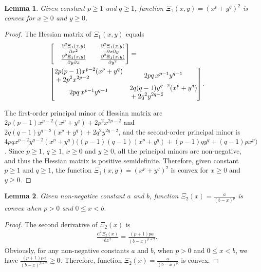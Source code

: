 \documentclass[10pt,journal,compsoc]{IEEEtran}
\newtheorem{lemma}{\textbf{Lemma}}
\newtheorem*{proof}{Proof}
\begin{document}
\begin{lemma}\label{lemma:Prove-Convex-1}
    Given constant $p \ge 1$ and $q \ge 1$, function $\Xi_{1}(x, y) = \left(x^{p} + y^{q}\right)^{2}$ is convex for $x \ge 0$ and $y \ge 0$.
\end{lemma}
\begin{proof}
    The Hessian matrix of $\Xi_{1}(x, y)$ equals
    \begin{align}
        &\begin{bmatrix}
        &\frac{\partial^{2}\Xi_{1}(x ,y)}{\partial x^{2}} &
        &\frac{\partial^{2}\Xi_{1}(x ,y)}{\partial x \partial y} \\
        &\frac{\partial^{2}\Xi_{1}(x ,y)}{\partial y \partial x} &
    &\frac{\partial^{2}\Xi_{1}(x ,y)}{\partial y^{2}}
        \end{bmatrix}
        = \notag \\
        &\begin{bmatrix}
        \begin{aligned}
        &2p(p-1)x^{p-2}(x^p+y^q) \\
        &+2p^2x^{2p-2}
        \end{aligned}
        &
        2pq\,x^{p-1}y^{q-1}
        \\
        2pq\,x^{p-1}y^{q-1}
        &
        \begin{aligned}
        &2q(q-1)y^{q-2}(x^p+y^q) \\
        &+2q^2y^{2q-2}
        \end{aligned}
        \end{bmatrix}.
    \end{align}

    The first-order principal minor of Hessian matrix are $2p(p-1)x^{p-2}(x^p+y^q)+2p^2x^{2p-2}$ and $2q(q-1)y^{q-2}(x^p+y^q)+2q^2y^{2q-2}$, 
    and the second-order principal minor is $4pqx^{p-2}y^{q-2}\left(x^{p} + y^{q}\right)\big((p - 1)(q - 1)\left(x^{p} + y^{q}\right) + (p - 1)qy^{q} + (q - 1)px^{p}\big)$. 
    Since $p \ge 1$, $q \ge 1$, $x \ge 0$ and $y \ge 0$, all the principal minors are non-negative, and thus the Hessian matrix is positive semidefinite. 
    Therefore, given constant $p \ge 1$ and $q \ge 1$, the function $\Xi_{1}(x, y) = (x^p + y^q)^2$ is convex for $x \ge 0$ and $y \ge 0$.
\end{proof}
\begin{lemma}\label{lemma:Prove-Convex-2}
    Given non-negative constant $a$ and $b$, function $\Xi_{2}(x) = \frac{a}{\left(b - x\right)^{p}}$ is convex when $p > 0$ and $0 \le x < b$.
\end{lemma}
\begin{proof}
    The second derivative of $\Xi_{2}(x)$ is
    \begin{align}
        \frac{\mathrm{d}^{2}\Xi_{2}(x)}{\mathrm{d}x^{2}} = \frac{(p + 1)pa}{\left(b - x\right)^{p + 2}}.
    \end{align}
    Obviously, for any non-negative constants $a$ and $b$, when $p > 0$ and $0 \le x < b$, we have $\frac{(p + 1)pa}{\left(b - x\right)^{p + 2}} \ge 0$. 
    Therefore, function $\Xi_{2}(x) = \frac{a}{\left(b - x\right)^{p}}$ is convex.
\end{proof}
\end{document}
